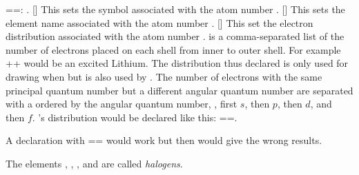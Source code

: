 \documentclass[load-preamble+]{cnltx-doc}
\begin{document}
\begin{commands}
    \verbcode==: .
  []
    This sets the symbol associated with the atom number
    .
  []
    This sets the element name associated with the atom
    number .
  []
    This set the electron distribution associated with the
    atom number .   is a
    comma-separated list of the number of electrons placed on each shell from
    inner to outer shell.  For example
    \verbcode++ would be an excited
    Lithium.  The distribution thus declared is only used for drawing when
     but is also used by .  The
    number of electrons with the same principal quantum number but a different
    angular quantum number are separated with a \code{+} ordered by the
    angular quantum number, \ie, first $s$, then $p$, then $d$, and then $f$.
    's distribution would be declared like this:
    \verbcode==.\par
    A declaration with \verbcode== would
    work but then  would give the wrong results.
\end{commands}

\begin{example}
  The elements , , ,
   and  are called \emph{halogens}.
\end{example}
\end{document}
